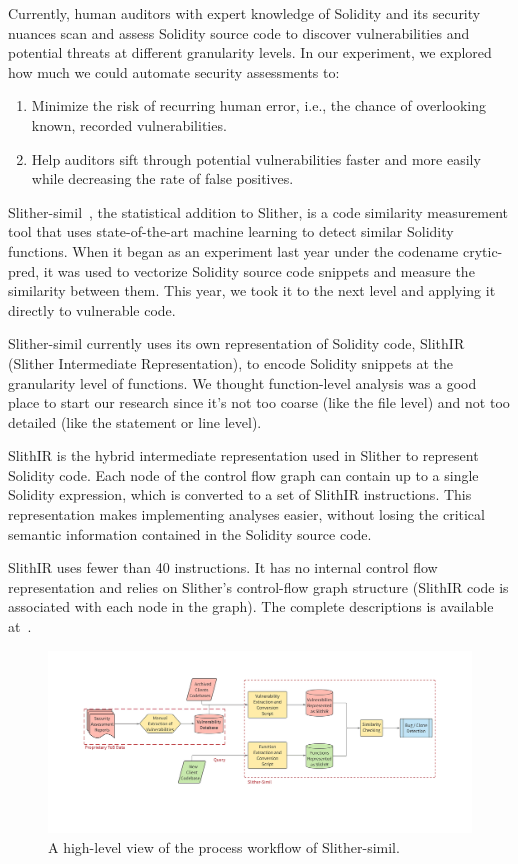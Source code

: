 Currently, human auditors with expert knowledge of Solidity and its security nuances scan and assess Solidity source code to discover vulnerabilities and potential threats at different granularity levels.
In our experiment, we explored how much we could automate security assessments to:
\begin{enumerate}
  \item Minimize the risk of recurring human error, i.e., the chance of overlooking known, recorded vulnerabilities.
  \item Help auditors sift through potential vulnerabilities faster and more easily while decreasing the rate of false positives.
\end{enumerate}

Slither-simil~\cite{slithersimil}, the statistical addition to Slither, is a code similarity measurement tool that uses state-of-the-art machine learning to detect similar Solidity functions.
When it began as an experiment last year under the codename crytic-pred, it was used to vectorize Solidity source code snippets and measure the similarity between them.
This year, we took it to the next level and applying it directly to vulnerable code.

Slither-simil currently uses its own representation of Solidity code, SlithIR (Slither Intermediate Representation), to encode Solidity snippets at the granularity level of functions.
We thought function-level analysis was a good place to start our research since it's not too coarse (like the file level) and not too detailed (like the statement or line level).

SlithIR is the hybrid intermediate representation used in Slither to represent Solidity code. Each node of the control flow graph can contain up to a single Solidity expression, which is converted to a set of SlithIR instructions.
This representation makes implementing analyses easier, without losing the critical semantic information contained in the Solidity source code.

SlithIR uses fewer than 40 instructions. It has no internal control flow representation and relies on Slither's control-flow graph structure (SlithIR code is associated with each node in the graph).
The complete descriptions is available at~\cite{slithir}.

\begin{figure}
  \centering
  \includegraphics[width=\textwidth]{figures/slitherS.png}
  \caption{A high-level view of the process workflow of Slither-simil.}
  \label{fig:slithersimilhighlevel}
\end{figure}

